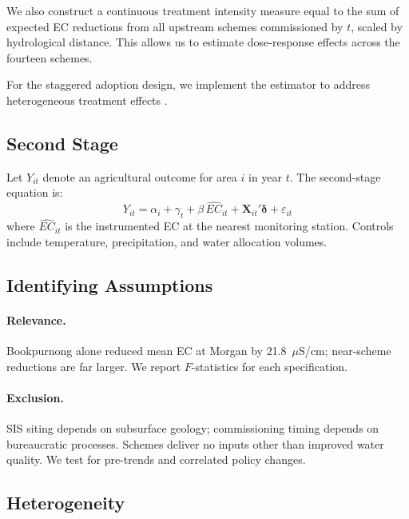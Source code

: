 \documentclass[12pt]{article}
\begin{document}
We also construct a continuous treatment intensity measure equal to the sum of expected EC reductions from all upstream schemes commissioned by $t$, scaled by hydrological distance. This allows us to estimate dose-response effects across the fourteen schemes.

For the staggered adoption design, we implement the \citet{callaway2021difference} estimator to address heterogeneous treatment effects \citep{roth2023whats, sun2021estimating, borusyak2024revisiting}.

\subsection{Second Stage}

Let $Y_{it}$ denote an agricultural outcome for area $i$ in year $t$. The second-stage equation is:
\begin{equation}\label{eq:second_stage}
    Y_{it} = \alpha_i + \gamma_t + \beta \, \widehat{EC}_{it} + \mathbf{X}_{it}'\boldsymbol{\delta} + \varepsilon_{it}
\end{equation}
where $\widehat{EC}_{it}$ is the instrumented EC at the nearest monitoring station. Controls include temperature, precipitation, and water allocation volumes.

\subsection{Identifying Assumptions}

\paragraph{Relevance.} Bookpurnong alone reduced mean EC at Morgan by 21.8~$\mu$S/cm; near-scheme reductions are far larger. We report $F$-statistics for each specification.

\paragraph{Exclusion.} SIS siting depends on subsurface geology; commissioning timing depends on bureaucratic processes. Schemes deliver no inputs other than improved water quality. We test for pre-trends and correlated policy changes.

\subsection{Heterogeneity}
\end{document}
